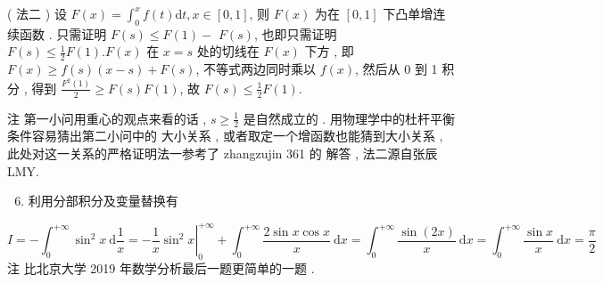 \documentclass[10pt]{article}
\begin{document}
{( 法二 )  设  $F(x)=\int_{0}^{x} f(t) \mathrm{d} t, x \in[0,1]$,  则  $F(x)$  为在  $[0,1]$  下凸单增连续函数 .  只需证明  $F(s) \leqslant F(1)-$ $F(s)$,  也即只需证明  $F(s) \leqslant \frac{1}{2} F(1) . F(x)$  在  $x=s$  处的切线在  $F(x)$  下方 ,  即  $F(x) \geqslant f(s)(x-s)+F(s)$,  不等式两边同时乘以  $f(x)$,  然后从  0  到  1  积分 ,  得到  $\frac{F^{2}(1)}{2} \geqslant F(s) F(1)$,  故  $F(s) \leqslant \frac{1}{2} F(1)$.

 注   第一小问用重心的观点来看的话 , $s \geqslant \frac{1}{2}$  是自然成立的 .  用物理学中的杜杆平衡条件容易猜出第二小问中的   大小关系 ,  或者取定一个增函数也能猜到大小关系 ,  此处对这一关系的严格证明法一参考了 zhangzujin 361  的   解答 ,  法二源自张辰  LMY.

\begin{enumerate}
  \setcounter{enumi}{5}
  \item  利用分部积分及变量替换有 
\end{enumerate}
$$
I=-\int_{0}^{+\infty} \sin ^{2} x \mathrm{~d} \frac{1}{x}=-\left.\frac{1}{x} \sin ^{2} x\right|_{0} ^{+\infty}+\int_{0}^{+\infty} \frac{2 \sin x \cos x}{x} \mathrm{~d} x=\int_{0}^{+\infty} \frac{\sin (2 x)}{x} \mathrm{~d} x=\int_{0}^{+\infty} \frac{\sin x}{x} \mathrm{~d} x=\frac{\pi}{2}
$$
 注   比北京大学  2019  年数学分析最后一题更简单的一题 .

}
\end{document}
